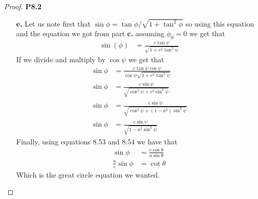 \documentclass[11pt]{article}
\theoremstyle{definition}
\begin{document}
\begin{proof}{\textbf{P8.2}}
\begin{itemize}
        \item [\textbf{e.}] Let us note first that
        $\sin\phi = \tan\phi /\sqrt{1 + \tan^2\phi}$ so using this equation
        and the equation we got from part \textbf{c.} assuming $\phi_0 = 0$
        we get that
        \begin{align*}
            \sin(\phi) &= \frac{c\tan\psi}{\sqrt{1 + c^2\tan^2\psi}}
        \end{align*}
        If we divide and multiply by $\cos\psi$ we get that
        \begin{align*}
            \sin\phi &= \frac{c\tan\psi\cos\psi}{\cos\psi\sqrt{1 + c^2\tan^2\psi}}\\
            \sin\phi &= \frac{c\sin\psi}{\sqrt{\cos^2\psi + c^2\sin^2\psi}}\\
            \sin\phi &= \frac{c\sin\psi}{\sqrt{\cos^2\psi + (1 - a^2)\sin^2\psi}}\\
            \sin\phi &= \frac{c\sin\psi}{\sqrt{1 - a^2\sin^2\psi}}
        \end{align*}
        Finally, using equations 8.53 and 8.54 we have that
        \begin{align*}
            \sin\phi &= \frac{c\cos\theta}{a\sin\theta}\\
            \frac{a}{c}\sin\phi &= \cot\theta
        \end{align*}
        Which is the great circle equation we wanted.
    \end{itemize}
\end{proof}
\cleardoublepage
\end{document}
